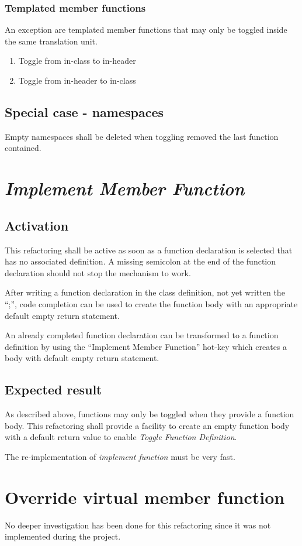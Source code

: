 \subsubsection{Templated member functions}
An exception are templated member functions that may only be toggled inside the 
same translation unit.
\begin{enumerate}
\item Toggle from in-class to in-header
\item Toggle from in-header to in-class
\end{enumerate}

\subsection{Special case - namespaces}

Empty namespaces shall be deleted when toggling removed the last function 
contained.

\section{\textit{Implement Member Function}}

\subsection{Activation}
This refactoring shall be active as soon as a function declaration is selected 
that has no associated definition. A missing semicolon at the end of the 
function declaration should not stop the mechanism to work.

After writing a function declaration in the class definition, not yet written
the ``;'', code completion can be used to create the function body with an
appropriate default empty return statement.\newline

An already completed function declaration can be transformed to a function
definition by using the ``Implement Member Function'' hot-key which creates a
body with default empty return statement.

\subsection{Expected result}
As described above, functions may only be toggled when they provide a function 
body. This refactoring shall provide a facility to create an empty function body 
with a default return value to enable \textit{Toggle Function Definition}.

The re-implementation of \textit{implement function} must be very fast. 

\section{Override virtual member function}

No deeper investigation has been done for this refactoring since it was not 
implemented during the project.

